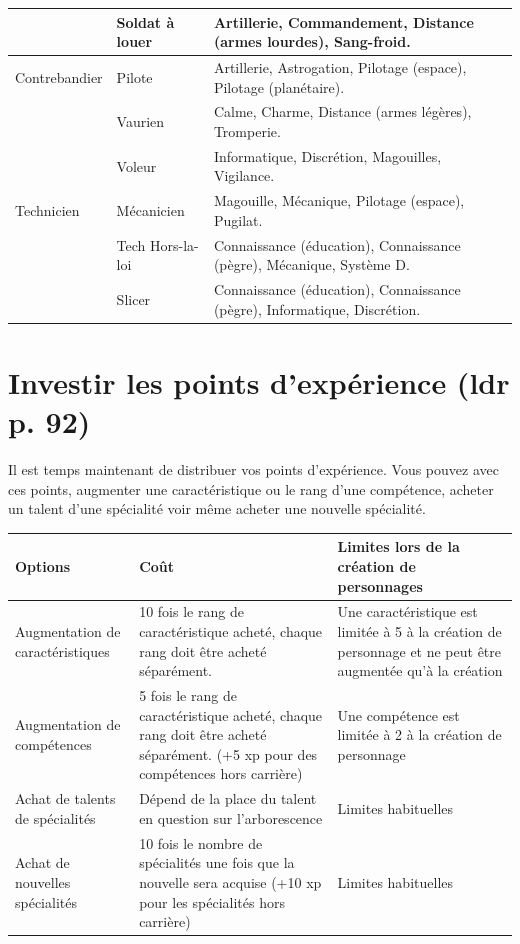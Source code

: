 \documentclass[twoside]{article}
\begin{document}
\begin{center}
\begin{tabular}{|m{3cm}|m{3cm}|p{10cm}|}
		\cline{2-3} & Soldat à louer & Artillerie, Commandement, Distance (armes lourdes), Sang-froid. \\
		\hline
		Contrebandier & Pilote & Artillerie, Astrogation, Pilotage (espace), Pilotage (planétaire). \\
		\cline{2-3} & Vaurien & Calme, Charme, Distance (armes légères), Tromperie. \\
		\cline{2-3} & Voleur & Informatique, Discrétion, Magouilles, Vigilance. \\
		\hline
		Technicien & Mécanicien & Magouille, Mécanique, Pilotage (espace), Pugilat. \\
		\cline{2-3} & Tech Hors-la-loi & Connaissance (éducation), Connaissance (pègre), Mécanique, Système D. \\
		\cline{2-3} & Slicer & Connaissance (éducation), Connaissance (pègre), Informatique, Discrétion. \\
		\hline
	\end{tabular}
\end{center}

\section{Investir les points d'expérience (ldr p. 92)}
Il est temps maintenant de distribuer vos points d'expérience. Vous pouvez avec ces points, augmenter une caractéristique ou le rang d'une compétence, acheter un talent d'une spécialité voir même acheter une nouvelle spécialité.

\begin{center}
	\begin{tabular}{|p{4cm}|p{6cm}|p{6cm}|}
		\hline
		\cellcolor{DarkRed} {\large \textcolor{PureWhite}{\textbf{Options}}} & \cellcolor{DarkRed} {\large \textcolor{PureWhite}{\textbf{Coût}}} & \cellcolor{DarkRed} {\large \textcolor{PureWhite}{\textbf{Limites lors de la création de personnages}}} \\
		\hline
		Augmentation de caractéristiques & 10 fois le rang de caractéristique acheté, chaque rang doit être acheté séparément. & Une caractéristique est limitée à 5 à la création de personnage et ne peut être augmentée qu'à la création \\
		\hline
		Augmentation de compétences & 5 fois le rang de caractéristique acheté, chaque rang doit être acheté séparément. (+5 xp pour des compétences hors carrière) & Une compétence est limitée à 2 à la création de personnage \\
		\hline
		Achat de talents de spécialités & Dépend de la place du talent en question sur l'arborescence & Limites habituelles \\
		\hline
		Achat de nouvelles spécialités & 10 fois le nombre de spécialités une fois que la nouvelle sera acquise (+10 xp pour les spécialités hors carrière) & Limites habituelles \\
		\hline		
	\end{tabular}
\end{center}
\end{document}
